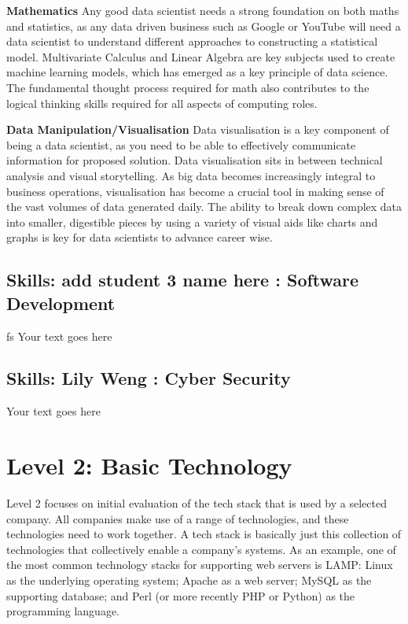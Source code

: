 \documentclass[a4paper, 11pt]{report}
\begin{document}
\textbf{Mathematics}
Any good data scientist needs a strong foundation on both maths and statistics, as any data driven business such as Google or YouTube will need a data scientist to understand different approaches to constructing a statistical model.  Multivariate Calculus and Linear Algebra are key subjects used to create machine learning models, which has emerged as a key principle of data science. The fundamental thought process required for math also contributes to the logical thinking skills required for all aspects of computing roles.

\textbf{Data Manipulation/Visualisation}
Data visualisation is a key component of being a data scientist, as you need to be able to effectively communicate information for proposed solution.  Data visualisation sits in between technical analysis and visual storytelling. As big data becomes increasingly integral to business operations, visualisation has become a crucial tool in making sense of the vast volumes of data generated daily. The ability to break down complex data into smaller, digestible pieces by using a variety of visual aids like charts and graphs is key for data scientists to advance career wise.



\subsection{Skills: add student 3 name here : Software Development}
fs
Your text goes here

\subsection{Skills: Lily Weng : Cyber Security}

Your text goes here



\newpage
\section{Level 2: Basic Technology}

Level 2 focuses on initial evaluation of the tech stack that is used by a selected company. All companies make use of a range of technologies, and these technologies need to work together. A tech stack is basically just this collection of technologies that collectively enable a company's systems. As an example, one of the most common technology stacks for supporting web servers is LAMP: Linux as the underlying operating system; Apache as a web server; MySQL as the supporting database; and Perl (or more recently PHP or Python) as the programming language.
\end{document}

